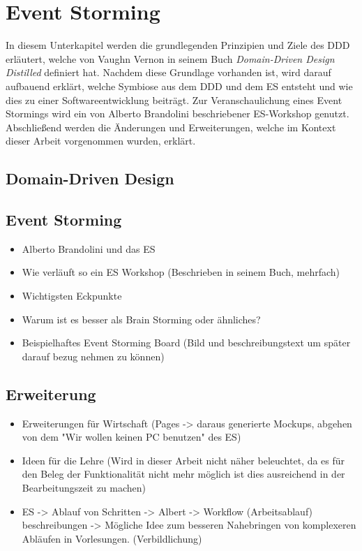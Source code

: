 \section{Event Storming}\label{sec:event-storming}
In diesem Unterkapitel werden die grundlegenden Prinzipien und Ziele des \ac{DDD} erläutert, welche von Vaughn Vernon in seinem Buch
\textit{Domain-Driven Design Distilled} definiert hat.\cite*{dddd}
Nachdem diese Grundlage vorhanden ist, wird darauf aufbauend erklärt, welche Symbiose aus dem \ac{DDD} und dem \ac{ES} entsteht und wie
dies zu einer Softwareentwicklung beiträgt.
Zur Veranschaulichung eines Event Stormings wird ein von Alberto Brandolini beschriebener \ac{ES}-Workshop genutzt.
Abschließend werden die Änderungen und Erweiterungen, welche im Kontext dieser Arbeit vorgenommen wurden, erklärt.

\subsection{Domain-Driven Design}\label{subsec:domain-driven-design}




\subsection{Event Storming}\label{subsec:allgemein}
\begin{itemize}
    \item Alberto Brandolini und das ES
    \item Wie verläuft so ein ES Workshop (Beschrieben in seinem Buch, mehrfach)
    \item Wichtigsten Eckpunkte
    \item Warum ist es besser als Brain Storming oder ähnliches?
    \item Beispielhaftes Event Storming Board (Bild und beschreibungstext um später darauf bezug nehmen zu können)
\end{itemize}

\subsection{Erweiterung}\label{subsec:erweiterung}
\begin{itemize}
    \item Erweiterungen für Wirtschaft (Pages -> daraus generierte Mockups, abgehen von dem "Wir wollen keinen PC benutzen" des ES)
    \item Ideen für die Lehre (Wird in dieser Arbeit nicht näher beleuchtet, da es für den Beleg der Funktionalität nicht mehr möglich ist dies ausreichend in der Bearbeitungszeit zu machen)
    \item ES -> Ablauf von Schritten -> Albert -> Workflow (Arbeitsablauf) beschreibungen -> Mögliche Idee zum besseren Nahebringen von komplexeren Abläufen in Vorlesungen. (Verbildlichung)
\end{itemize}
